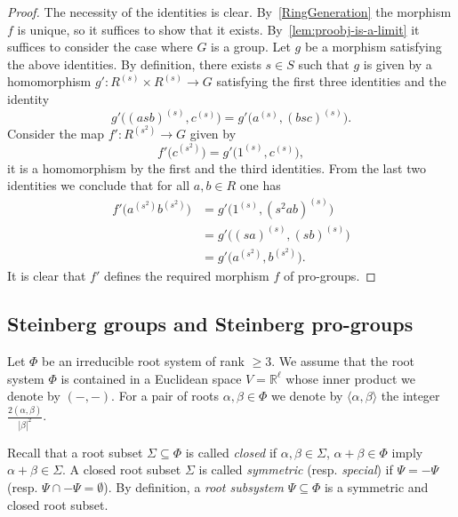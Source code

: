 \documentclass[oneside, 11pt]{amsart}
\numberwithin{equation}{section}
\theoremstyle{definition}
\theoremstyle{remark}
\begin{document}
\begin{proof}
The necessity of the identities is clear.
By~\cref{RingGeneration} the morphism \(f\) is unique, so it suffices to show that it exists.
By~\cref{lem:proobj-is-a-limit} it suffices to consider the case where \(G\) is a group. 
Let \(g\) be a morphism satisfying the above identities.
By definition, there exists $s\in S$ such that $g$ is given by a homomorphism \(g' \colon R^{(s)} \times R^{(s)} \to G\) satisfying the first three identities and the identity 
\[g'\bigl((asb)^{(s)}, c^{(s)}\bigr) = g'\bigl(a^{(s)}, (bsc)^{(s)}\bigr).\]
Consider the map \(f' \colon R^{(s^2)} \to G\) given by
\[f'\bigl(c^{(s^2)}\bigr) = g'\bigl(1^{(s)}, c^{(s)}\bigr),\]
it is a homomorphism by the first and the third identities.
From the last two identities we conclude that for all \(a, b \in R\) one has
\begin{align*}
f'\bigl(a^{(s^2)} b^{(s^2)}\bigr)
&= g' \bigl( 1^{(s)}, (s^2 ab)^{(s)} \bigr)\\
&= g' \bigl( (sa)^{(s)}, (sb)^{(s)} \bigr)\\
&= g' \bigl(a^{(s^2)}, b^{(s^2)}\bigr).
\end{align*}
It is clear that \(f'\) defines the required morphism \(f\) of pro-groups.
\end{proof}

\subsection{Steinberg groups and Steinberg pro-groups}
Let $\Phi$ be an irreducible root system of rank $\geq 3$.
We assume that the root system $\Phi$ is contained in a Euclidean space $V = \mathbb{R}^\ell$ whose inner product we denote by $(-, -)$.
For a pair of roots $\alpha, \beta \in \Phi$ we denote by $\langle \alpha, \beta \rangle$ the integer $\tfrac{2(\alpha, \beta)}{|\beta|^2}$.

Recall that a root subset $\Sigma \subseteq \Phi$ is called {\it closed} if $\alpha, \beta \in \Sigma$, $\alpha+\beta\in\Phi$ imply $\alpha+\beta\in \Sigma$. A closed root subset $\Sigma$ is called {\it symmetric} (resp. {\it special}) if $\Psi = -\Psi$ (resp. $\Psi \cap -\Psi = \emptyset$). By definition, a {\it root subsystem} $\Psi \subseteq \Phi$ is a symmetric and closed root subset.
\end{document}
